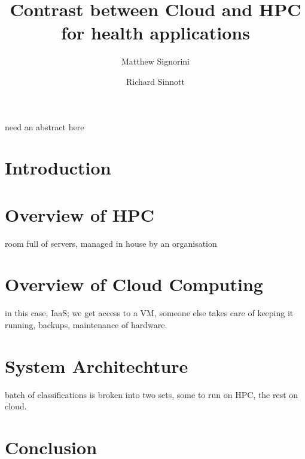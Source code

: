 \documentclass[a4paper]{article}
\title{Contrast between Cloud and HPC for health applications}
\author{Matthew Signorini \and Richard Sinnott}
\begin{document}
\maketitle

need an abstract here

\section{Introduction}


\section{Overview of HPC}
room full of servers, managed in house by an organisation

\section{Overview of Cloud Computing}
in this case, IaaS; we get access to a VM, someone else takes care of
keeping it running, backups, maintenance of hardware.

\section{System Architechture}
batch of classifications is broken into two sets, some to run on HPC, the 
rest on cloud.

\section{Conclusion}
\end{document}
